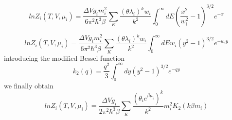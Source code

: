 \documentclass[12pt,a4paper]{book}
\begin{document}
		\begin{equation}
		ln Z_i(T,V,\mu_i)= \frac{\Delta V g_i m_i^2}{6 \pi^2\hbar^3 \beta} \sum_{K} \frac{(\theta \lambda_i)^k w_i}{k^2}  \int_{0}^{\infty} dE (\frac{x^2}{w_i^2}-1)^{3/2} e^{-x} 
	\end{equation}
	
	\begin{equation}
		ln Z_i(T,V,\mu_i)= \frac{\Delta V g_i m_i^2}{6 \pi^2\hbar^3 \beta} \sum_{K} \frac{(\theta \lambda_i)^k w_i}{k^2}  \int_{0}^{\infty} dE w_i (y^2-1)^{3/2} e^{-w_i y} 
	\end{equation}
	introducing the modified Bessel function 
	\begin{equation}
		k_2(q)= \frac{q^2}{3} \int_{0}^{\infty} dy (y^2-1)^{3/2} e^{-qy}
	\end{equation}
	we finally obtain
	\begin{equation}
		ln Z_i(T,V,\mu_i)= \frac{\Delta V g_i}{2\pi^2\hbar^3\beta} \sum_{K} \frac{(\theta_i e^{\beta \mu_i})^k}{k^2} m_i^2K_2(k\beta m_i)
	\end{equation}
	
	
	
	
	
	
	
	
	
	\printbibliography
	
\end{document}
